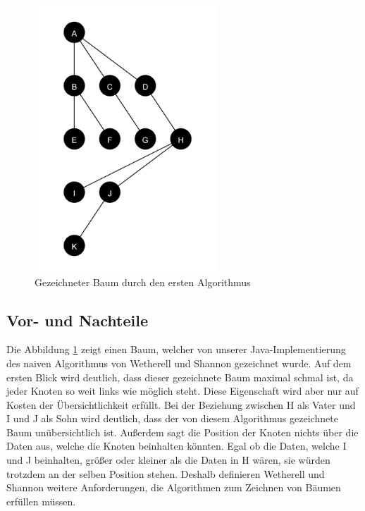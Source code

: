 \begin{figure}[H]
    \centering
    \includegraphics[width=7cm, height=10cm]{abbildungen/baum_algo_1}
    \caption{Gezeichneter Baum durch den ersten Algorithmus}
    \label{pic:baum_algo_1} 
\end{figure}

\subsection{Vor- und Nachteile}
Die Abbildung \ref{pic:baum_algo_1} zeigt einen Baum, welcher von unserer Java-Implementierung des naiven Algorithmus von Wetherell und Shannon
gezeichnet wurde.
Auf dem ersten Blick wird deutlich, dass dieser gezeichnete Baum maximal schmal ist, da jeder Knoten so weit links wie möglich steht.
Diese Eigenschaft wird aber nur auf Kosten der Übersichtlichkeit erfüllt. Bei der Beziehung zwischen H als Vater und I und J als Sohn wird 
deutlich, dass der von diesem Algorithmus gezeichnete Baum unübersichtlich ist. Außerdem sagt die Position der Knoten nichts über die Daten 
aus, welche die Knoten beinhalten könnten. Egal ob die Daten, welche I und J beinhalten, größer oder kleiner als die Daten in H wären, 
sie würden trotzdem an der selben Position stehen. 
Deshalb definieren Wetherell und Shannon weitere Anforderungen, die Algorithmen zum Zeichnen von Bäumen erfüllen müssen.

